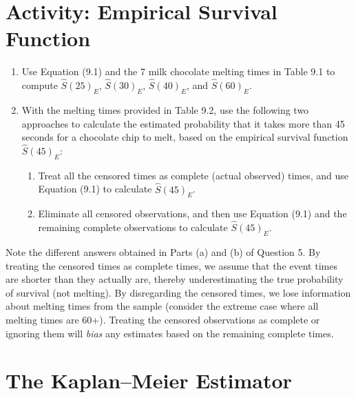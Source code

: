 \documentclass[
]{report}
\providecommand{\tightlist}{%
  \setlength{\itemsep}{0pt}\setlength{\parskip}{0pt}}
\begin{document}
\section*{Activity: Empirical Survival Function}\label{activity-empirical-survival-function}

\begin{enumerate}
\def\labelenumi{\arabic{enumi}.}
\setcounter{enumi}{3}
\tightlist
\item
  Use Equation (9.1) and the 7 milk chocolate melting times in Table 9.1 to compute \(\hat S(25)_{E}\), \(\hat S(30)_{E}\), \(\hat S(40)_{E}\), and \(\hat S(60)_{E}\).\\
\item
  With the melting times provided in Table 9.2, use the following two approaches to calculate the estimated probability that it takes more than 45 seconds for a chocolate chip to melt, based on the empirical survival function \(\hat S(45)_{E}\):

  \begin{enumerate}
  \def\labelenumii{\alph{enumii}.}
  \tightlist
  \item
    Treat all the censored times as complete (actual observed) times, and use Equation (9.1) to calculate \(\hat S(45)_{E}\).\\
  \item
    Eliminate all censored observations, and then use Equation (9.1) and the remaining complete observations to calculate \(\hat S(45)_{E}\).
  \end{enumerate}
\end{enumerate}

Note the different answers obtained in Parts (a) and (b) of Question 5. By treating the censored times as complete times, we assume that the event times are shorter than they actually are, thereby underestimating the true probability of survival (not melting). By disregarding the censored times, we lose information about melting times from the sample (consider the extreme case where all melting times are 60+). Treating the censored observations as complete or ignoring them will \emph{bias} any estimates based on the remaining complete times.

\section{\texorpdfstring{\textbf{The Kaplan--Meier Estimator}}{The Kaplan--Meier Estimator}}\label{the-kaplanmeier-estimator}
\end{document}
